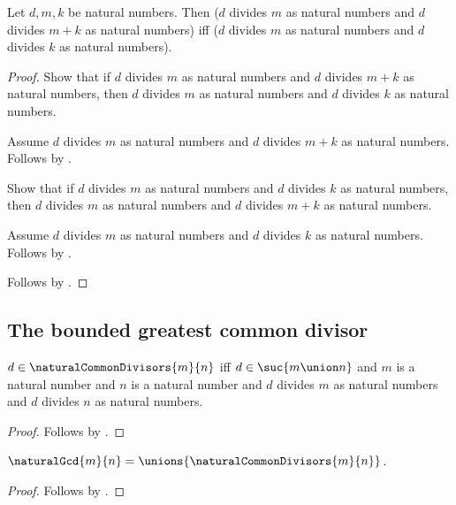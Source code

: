 \begin{corollary}\label{common_divisor_sum_iff_difference}
    Let $d,m,k$ be natural numbers.
    Then
        ($d$ divides $m$ as natural numbers and
            $d$ divides $m+k$ as natural numbers)
        iff
        ($d$ divides $m$ as natural numbers and
            $d$ divides $k$ as natural numbers).
\end{corollary}
\begin{proof}
    Show that if $d$ divides $m$ as natural numbers and
        $d$ divides $m+k$ as natural numbers,
        then $d$ divides $m$ as natural numbers and
            $d$ divides $k$ as natural numbers.
    \begin{subproof}
        Assume $d$ divides $m$ as natural numbers and
            $d$ divides $m+k$ as natural numbers.
        Follows by .
    \end{subproof}
    Show that if $d$ divides $m$ as natural numbers and
        $d$ divides $k$ as natural numbers,
        then $d$ divides $m$ as natural numbers and
            $d$ divides $m+k$ as natural numbers.
    \begin{subproof}
        Assume $d$ divides $m$ as natural numbers and
            $d$ divides $k$ as natural numbers.
        Follows by .
    \end{subproof}
    Follows by \auto.
\end{proof}

\subsection{The bounded greatest common divisor}

\begin{proposition}\label{common_divisors_iff}
    $d\in\naturalCommonDivisors{m}{n}$ iff
        $d\in\suc{m\union n}$ and
        $m$ is a natural number and $n$ is a natural number and
        $d$ divides $m$ as natural numbers and
        $d$ divides $n$ as natural numbers.
\end{proposition}
\begin{proof}
    Follows by .
\end{proof}

\begin{proposition}\label{gcd_is_union_of_common_divisors}
    $\naturalGcd{m}{n}=
        \unions{\naturalCommonDivisors{m}{n}}$.
\end{proposition}
\begin{proof}
    Follows by .
\end{proof}

